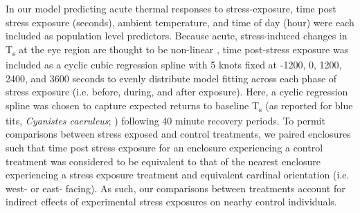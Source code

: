 \documentclass[12pt]{article}
\begin{document}
\noindent In our model predicting acute thermal responses to stress-exposure, time post stress exposure (seconds), ambient temperature, and time of day (hour) were each included as population level predictors. Because acute, stress-induced changes in T\textsubscript{s} at the eye region are thought to be non-linear \citep{jerem_2015,jerem_2019}, time post-stress exposure was included as a cyclic cubic regression spline with 5 knots fixed at -1200, 0, 1200, 2400, and 3600 seconds to evenly distribute model fitting across each phase of stress exposure (i.e. before, during, and after exposure). Here, a cyclic regression spline was chosen to capture expected returns to baseline T\textsubscript{s} (as reported for blue tits, \textit{Cyanistes caeruleus}; \citealt{jerem_2019}) following 40 minute recovery periods. To permit comparisons between stress exposed and control treatments, we paired enclosures such that time post stress exposure for an enclosure experiencing a control treatment was considered to be equivalent to that of the nearest enclosure experiencing a stress exposure treatment and equivalent cardinal orientation (i.e. west- or east- facing). As such, our comparisons between treatments account for indirect effects of experimental stress exposures on nearby control individuals. \vspace{1cm}
\end{document}
